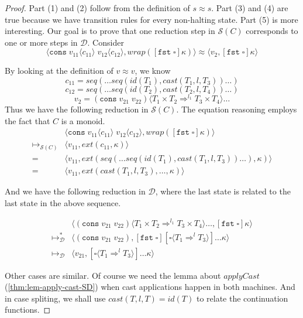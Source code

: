 \documentclass[acmsmall,review,anonymous]{acmart}\settopmatter{printfolios=true,printccs=false,printacmref=false}
\newcommand{\sOOreturn}[2]{\langle#1,#2\rangle}
\newcommand{\POOprod}[2]{#1 \times #2}
\newcommand{\cOOcast}[3]{#1 \Rightarrow^{#2} #3}
\newcommand{\vOOcast}[2]{#1\langle#2\rangle}
\newcommand{\vOOcons}[2]{\mathtt{cons}\;#1\;#2}
\newcommand{\kOOcar}[1]{[\mathtt{fst} \; \square]#1}
\newcommand{\kOOcast}[2]{
  [\square \langle #1 \rangle]#2}
\newcommand{\hcvOOcons}[4]{\mathtt{cons}\;#1\langle#2\rangle\;#3\langle#4\rangle}
\newcommand{\ineffCEKD}{$\mathcal{D}$}
\newcommand{\effCEK}[1]{$\mathcal{S}(#1)$}
\begin{document}
\begin{proof}
  Part (1) and (2) follow from the definition of $s \approx s$.
  Part (3) and (4) are true because we have transition rules for every 
  non-halting state.
  Part (5) is more interesting. Our goal is to prove that one reduction step 
  in  \effCEK{C} corresponds to one or more steps in \ineffCEKD.  
  Consider
  \[
  \sOOreturn{\hcvOOcons{v_{11}}{c_{11}}{v_{12}}{c_{12}}}{
    wrap(\kOOcar{\kappa})
  }
  \approx
  \sOOreturn{v_2}{\kOOcar{\kappa}}
  \]

  By looking at the definition of $v \approx v$, we know
  \[ c_{11} = seq(\dots seq(id(T_1),cast(T_1,l,T_3)) \dots) \]
  \[ c_{12} = seq(\dots seq(id(T_2),cast(T_2,l,T_4)) \dots) \] 
  \[ v_2 = \vOOcast{(\vOOcons{v_{21}}{v_{22}})}{
    \cOOcast{\POOprod{T_1}{T_2}}{l_1}{\POOprod{T_3}{T_4}}} \dots
  \]
  Thus we have the following reduction in \effCEK{C}. The equation 
  reasoning employs the fact that $C$ is a monoid.
  \[
  \begin{array}{ll}
&
\sOOreturn{\hcvOOcons{v_{11}}{c_{11}}{v_{12}}{c_{12}}}{wrap(\kOOcar{\kappa})}
\\
\longmapsto_\text{\effCEK{C}} &
\sOOreturn{v_{11}}{ext(c_{11},\kappa)}
\\
= &
\sOOreturn{v_{11}}{ext(seq(\dots seq(id(T_1),cast(T_1,l,T_3))\dots),\kappa)}
\\
= &
\sOOreturn{v_{11}}{ext(cast(T_1,l,T_3),\dots,\kappa)}
  \end{array}
  \]

And we have the following reduction in \ineffCEKD, where the last state is 
related to the last state in the above sequence.

\[
\begin{array}{ll}
& \sOOreturn{
  \vOOcast{(\vOOcons{v_{21}}{v_{22}})}{   
  \cOOcast{\POOprod{T_1}{T_2}}{l_1}{\POOprod{T_3}{T_4}}} \dots
}{\kOOcar{\kappa}}
\\
\longmapsto_{\mathcal{D}}^{*} &
\sOOreturn{(\vOOcons{v_{21}}{v_{22}})}{
  \kOOcar{
  \kOOcast{\cOOcast{T_1}{l}{T_3}}{\dots\kappa}
}}
\\
\longmapsto_{\mathcal{D}} &
\sOOreturn{v_{21}}{
  \kOOcast{\cOOcast{T_1}{l}{T_3}}{\dots\kappa}
}
\end{array}
\]

Other cases are similar. Of course we need the lemma about $applyCast$ 
(\ref{thm:lem-apply-cast-SD}) when cast applications happen in both machines. 
And in case spliting, we shall use $cast(T,l,T)=id(T)$ to relate the 
continuation functions.
\end{proof}
\end{document}
